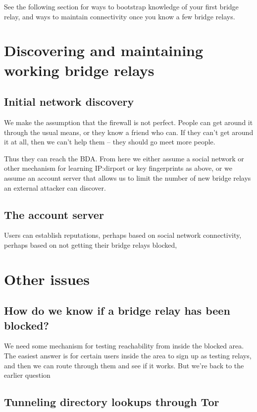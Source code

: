\documentclass{llncs}
\begin{document}
See the following section for ways to bootstrap knowledge of your first
bridge relay, and ways to maintain connectivity once you know a few
bridge relays.

\section{Discovering and maintaining working bridge relays}

\subsection{Initial network discovery}

We make the assumption that the firewall is not perfect. People can
get around it through the usual means, or they know a friend who can.
If they can't get around it at all, then we can't help them -- they
should go meet more people.

Thus they can reach the BDA. From here we either assume a social
network or other mechanism for learning IP:dirport or key fingerprints
as above, or we assume an account server that allows us to limit the
number of new bridge relays an external attacker can discover.

\subsection{The account server}

Users can establish reputations, perhaps based on social network
connectivity, perhaps based on not getting their bridge relays blocked,



\section{Other issues}

\subsection{How do we know if a bridge relay has been blocked?}

We need some mechanism for testing reachability from inside the
blocked area. The easiest answer is for certain users inside
the area to sign up as testing relays, and then we can route through
them and see if it works. But we're back to the earlier question


\subsection{Tunneling directory lookups through Tor}
\end{document}
